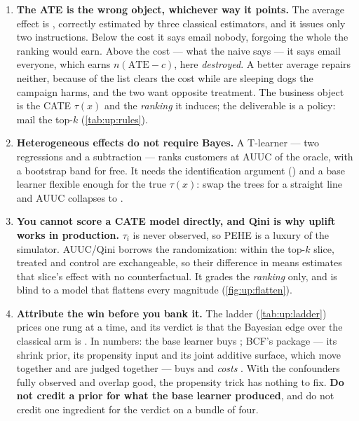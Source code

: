 \begin{enumerate}[leftmargin=*, itemsep=.45em]
  \item \textbf{The ATE is the wrong object, whichever way it points.} The average effect is
        \eur{\nbOneTrueAte}, correctly estimated by three classical estimators, and it issues only two
        instructions. Below the cost it says email nobody, forgoing the whole \eur{\nbOneOracleProfit}
        the ranking would earn. Above the cost --- what the naive \eur{\nbOneNaiveEst} says --- it says
        email everyone, which earns $n(\text{ATE} - c)$, here \eur{\nbOneTreatAllLoss} \emph{destroyed}.
        A better average repairs neither, because \pc{\nbOneShareProfitable} of the list clears the cost
        while \pc{\nbOneShareSleeping} are sleeping dogs the campaign harms, and the two want opposite
        treatment. The business object is the CATE $\tau(x)$ and the \emph{ranking} it induces; the
        deliverable is a policy: mail the top-$k$ (\cref{tab:up:rules}).

  \item \textbf{Heterogeneous effects do not require Bayes.} A T-learner --- two regressions and a
        subtraction --- ranks customers at AUUC \nbOneGbmTAuuc{} of the oracle, with a bootstrap band
        for free. It needs the identification argument () and a
        base learner flexible enough for the true $\tau(x)$: swap the trees for a straight line and
        AUUC collapses to \nbOneOlsTAuuc.

  \item \textbf{You cannot score a CATE model directly, and Qini is why uplift works in production.}
        $\tau_i$ is never observed, so PEHE is a luxury of the simulator. AUUC/Qini borrows the
        randomization: within the top-$k$ slice, treated and control are exchangeable, so their
        difference in means estimates that slice's effect with no counterfactual. It grades the
        \emph{ranking} only, and is blind to a model that flattens every magnitude
        (\cref{fig:up:flatten}).

  \item \textbf{Attribute the win before you bank it.} The ladder (\cref{tab:up:ladder}) prices one
        rung at a time, and its verdict is that the Bayesian edge over the classical arm is
        \nbOneAttrVerdict. In numbers: the base learner buys \nbOneAttrBaselearner; BCF's package ---
        its shrink prior, its propensity input and its joint additive surface, which move together and
        are judged together --- buys \nbOneAttrBcfBuys{} and \emph{costs} \nbOneAttrBcfCosts. With the
        confounders fully observed and overlap good, the propensity trick has nothing to fix.
        \textbf{Do not credit a prior for what the base learner produced}, and do not credit one
        ingredient for the verdict on a bundle of four.


\end{enumerate}
